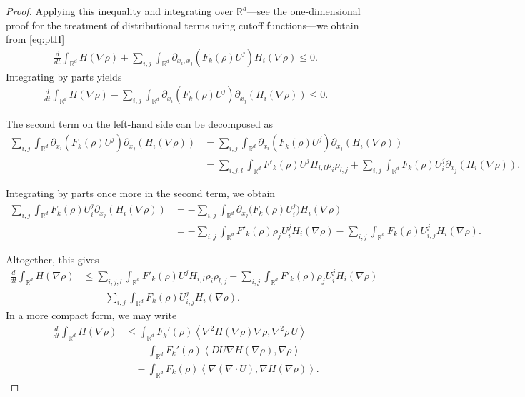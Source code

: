 \documentclass[11pt,twoside]{article}
\numberwithin{equation}{section}
\newcommand{\R}{\mathbb{R}}
\newcommand {\p}   {\partial}
\begin{document}
\begin{proof}
Applying this inequality and integrating over $\R^d$—see the one-dimensional proof for the treatment of distributional terms using cutoff functions—we obtain from \eqref{eq:ptH}
\begin{align*}
\frac{d}{dt}\int_{\R^d} H(\nabla \rho)
+ \sum_{i,j} \int_{\R^d} \p_{x_i,x_j}\left(F_k(\rho)U^j\right) H_i(\nabla \rho)
\le 0.
\end{align*}
Integrating by parts yields
\begin{align*}
\frac{d}{dt}\int_{\R^d} H(\nabla \rho)
- \sum_{i,j} \int_{\R^d} \p_{x_i}\left(F_k(\rho)U^j\right)
  \p_{x_j}\left(H_i(\nabla \rho)\right)
\le 0.
\end{align*}

The second term on the left-hand side can be decomposed as
\[
\begin{aligned}
\sum_{i,j}\int_{\R^d} \p_{x_i}(F_k(\rho)U^j)\p_{x_j}(H_i(\nabla \rho))
&= \sum_{i,j}\int_{\R^d} \p_{x_i}(F_k(\rho)U^j) \p_{x_j}(H_i(\nabla \rho)) \\
&= \sum_{i,j,l} \int_{\R^d} F'_k(\rho) U^j H_{i,l} \rho_i \rho_{l,j}
 + \sum_{i,j} \int_{\R^d} F_k(\rho) U^j_i \p_{x_j}(H_i(\nabla \rho)).
\end{aligned}
\]

Integrating by parts once more in the second term, we obtain
\begin{align*}
\sum_{i,j} \int_{\R^d} F_k(\rho) U^j_i \p_{x_j}(H_i(\nabla \rho))
&= - \sum_{i,j} \int_{\R^d} \p_{x_j}\big(F_k(\rho) U^j_i\big) H_i(\nabla \rho) \\
&= - \sum_{i,j} \int_{\R^d} F'_k(\rho) \rho_j U^j_i H_i(\nabla \rho)
   - \sum_{i,j} \int_{\R^d} F_k(\rho) U^j_{i,j} H_i(\nabla \rho).
\end{align*}

Altogether, this gives
\begin{align*}
\frac{d}{dt}\int_{\R^d} H(\nabla \rho)
&\le \sum_{i,j,l} \int_{\R^d} F'_k(\rho) U^j H_{i,l} \rho_i \rho_{l,j}
 - \sum_{i,j} \int_{\R^d} F'_k(\rho) \rho_j U^j_i H_i(\nabla \rho) \\
&\quad - \sum_{i,j} \int_{\R^d} F_k(\rho) U^j_{i,j} H_i(\nabla \rho).
\end{align*}
In a more compact form, we may write
\begin{align*}
\frac{d}{dt}\int_{\R^d} H(\nabla \rho)
&\le \int_{\R^d} F_k'(\rho)
   \left\langle \nabla^2 H(\nabla \rho)\nabla \rho,
   \nabla^2 \rho\, U \right\rangle \\
&\quad - \int_{\R^d} F_k'(\rho)
   \left\langle DU \nabla H(\nabla \rho), \nabla \rho \right\rangle \\
&\quad - \int_{\R^d} F_k(\rho)
   \left\langle \nabla(\nabla \cdot U), \nabla H(\nabla \rho) \right\rangle.
\end{align*}


\end{proof}
\end{document}
